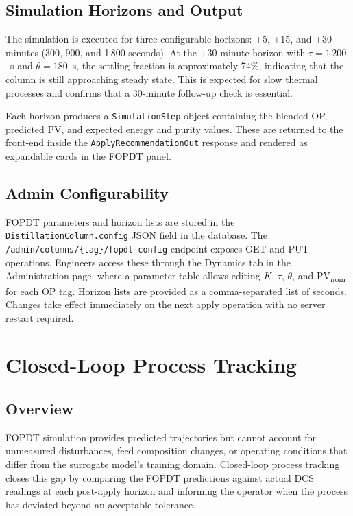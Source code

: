 \subsection{Simulation Horizons and Output}

The simulation is executed for three configurable horizons: +5, +15, and
+30 minutes (300, 900, and 1\,800 seconds).  At the +30-minute horizon with
$\tau = 1\,200$~s and $\theta = 180$~s, the settling fraction is
approximately 74\%, indicating that the column is still approaching steady
state.  This is expected for slow thermal processes and confirms that a
30-minute follow-up check is essential.

Each horizon produces a \texttt{SimulationStep} object containing the
blended OP, predicted PV, and expected energy and purity values.  These are
returned to the front-end inside the \texttt{ApplyRecommendationOut} response
and rendered as expandable cards in the FOPDT panel.

\subsection{Admin Configurability}

FOPDT parameters and horizon lists are stored in the
\texttt{DistillationColumn.config} JSON field in the database.  The
\texttt{/admin/columns/\{tag\}/fopdt-config} endpoint exposes GET and PUT
operations.  Engineers access these through the Dynamics tab in the
Administration page, where a parameter table allows editing $K$, $\tau$,
$\theta$, and PV\textsubscript{nom} for each OP tag.  Horizon lists are
provided as a comma-separated list of seconds.  Changes take effect
immediately on the next apply operation with no server restart required.

\section{Closed-Loop Process Tracking}
\label{sec:tracking}

\subsection{Overview}

FOPDT simulation provides predicted trajectories but cannot account for
unmeasured disturbances, feed composition changes, or operating conditions
that differ from the surrogate model's training domain.  Closed-loop process
tracking closes this gap by comparing the FOPDT predictions against actual
DCS readings at each post-apply horizon and informing the operator when the
process has deviated beyond an acceptable tolerance.

